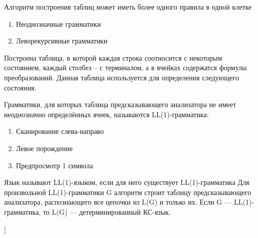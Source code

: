 Алгоритм построения таблиц может иметь более одного правила в одной клетке
\begin{enumerate}
\item Неоднозначные грамматики
\item Леворекурсивные грамматики
\end{enumerate}

Построена таблица, в которой каждая строка соотносится с некоторым состоянием, каждый столбез -- с терминалом, а в ячейках содержатся формулы преобразований. Данная таблица используется для определения следующего состояния.

Грамматики, для которых таблица предсказывающего анализатора не имеет неоднозначно определённых ячеек, называются LL(1)-грамматика:
\begin{enumerate}
\item Сканирование слева-направо
\item Левое порождение
\item Предпросмотр 1 символа
\end{enumerate}

Язык называют LL(1)-языком, если для него существует LL(1)-грамматика \newline
Для произвольной LL(1)-грамматики G алгоритм строит таблицу
предсказывающего анализатора, распознающего все цепочки из L(G) и только их.\newline
Если G — LL(1)-грамматика, то L(G) — детерминированный КС-язык.


\bigbreak
[\cite[page 69-96]{replace_me}]